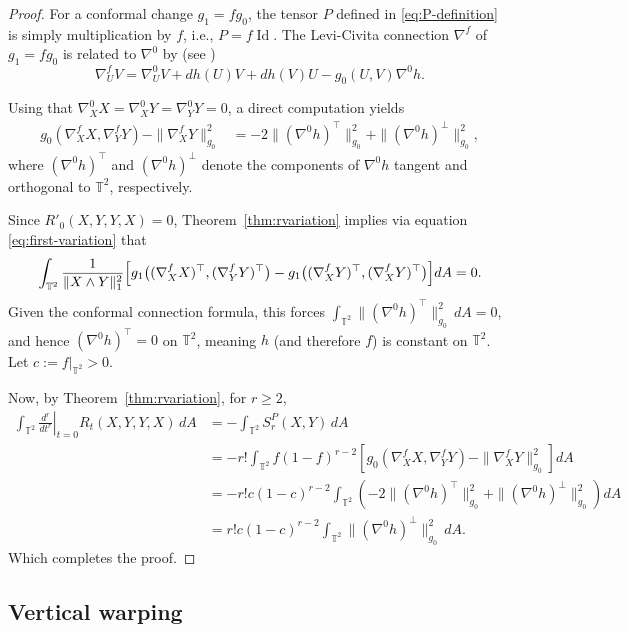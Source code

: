 \documentclass[graybox]{svmult}
\begin{document}
\begin{proof}
For a conformal change $g_1 = f g_0$, the tensor $P$ defined in \eqref{eq:P-definition} is simply multiplication by $f$, i.e., $P = f \operatorname{Id}$. The Levi-Civita connection $\nabla^f$ of $g_1 = f g_0$ is related to $\nabla^0$ by (see \cite[p. 144]{walschap-warped})
\[
\nabla^f_U V = \nabla^0_U V + dh(U)V + dh(V)U - g_0(U,V)\nabla^0 h.
\]


Using that $\nabla^0_X X = \nabla^0_X Y = \nabla^0_Y Y = 0$, a direct computation yields
\begin{align}
g_0(\nabla^f_X X, \nabla^f_Y Y) - \|\nabla^f_X Y\|_{g_0}^2 
&= -2\|(\nabla^0 h)^\top\|_{g_0}^2 + \|(\nabla^0 h)^\perp\|_{g_0}^2, \label{eq:conformal-computation}
\end{align}
where $(\nabla^0 h)^\top$ and $(\nabla^0 h)^\perp$ denote the components of $\nabla^0 h$ tangent and orthogonal to $\mathbb{T}^2$, respectively.

Since $R'_0(X,Y,Y,X) = 0$, Theorem~\ref{thm:rvariation} implies via equation \eqref{eq:first-variation} that
\[
\int_{\mathbb{T}^2} \frac{1}{\|X\wedge Y\|_1^2} \Bigl[g_1\bigl((\nabla^f_X X)^\top, (\nabla^f_Y Y)^\top\bigr) - g_1\bigl((\nabla^f_X Y)^\top, (\nabla^f_X Y)^\top\bigr) \Bigr] dA = 0.
\]
Given the conformal connection formula, this forces $\int_{\mathbb{T}^2} \|(\nabla^0 h)^\top\|_{g_0}^2 \, dA = 0$, and hence $(\nabla^0 h)^\top = 0$ on $\mathbb{T}^2$, meaning $h$ (and therefore $f$) is constant on $\mathbb{T}^2$. Let $c := f|_{\mathbb{T}^2} > 0$.

Now, by Theorem~\ref{thm:rvariation}, for $r \geq 2$,
\begin{align*}
\int_{\mathbb{T}^2} \left.\frac{d^r}{dt^r}\right|_{t=0} R_t(X,Y,Y,X) \, dA
&= -\int_{\mathbb{T}^2} S_r^P(X,Y) \, dA \\
&= -r!\int_{\mathbb{T}^2} f(1-f)^{r-2} \left[g_0(\nabla^f_X X, \nabla^f_Y Y) - \|\nabla^f_X Y\|_{g_0}^2\right] dA \\
&= -r!c(1-c)^{r-2} \int_{\mathbb{T}^2} \left(-2\|(\nabla^0 h)^\top\|_{g_0}^2 + \|(\nabla^0 h)^\perp\|_{g_0}^2\right) dA \\
&= r! c(1-c)^{r-2} \int_{\mathbb{T}^2} \|(\nabla^0 h)^\perp\|_{g_0}^2 \, dA.
\end{align*}
Which completes the proof.
\end{proof}

\subsection{Vertical warping}
\end{document}
